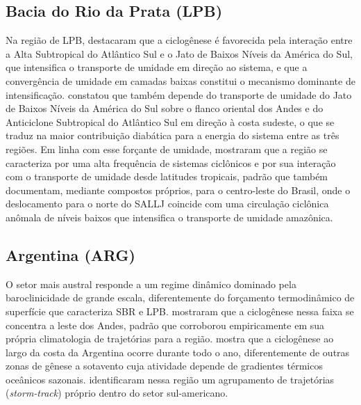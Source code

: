 \subsection{Bacia do Rio da Prata (LPB)}\label{subsec:tb_lpb}
Na região de LPB, \citet{gramcianinov2024early} destacaram que a ciclogênese é favorecida pela interação entre a Alta Subtropical do Atlântico Sul e o Jato de Baixos Níveis da América do Sul, que intensifica o transporte de umidade em direção ao sistema, e que a convergência de umidade em camadas baixas constitui o mecanismo dominante de intensificação.
\citet{coutodesouza2024thesis} constatou que também depende do transporte de umidade do Jato de Baixos Níveis da América do Sul sobre o flanco oriental dos Andes e do Anticiclone Subtropical do Atlântico Sul em direção à costa sudeste, o que se traduz na maior contribuição diabática para a energia do sistema entre as três regiões.
Em linha com esse forçante de umidade, \citet{reboita2010south} mostraram que a região se caracteriza por uma alta frequência de sistemas ciclônicos e por sua interação com o transporte de umidade desde latitudes tropicais, padrão que \citet{laureanti2024relation} também documentam, mediante compostos próprios, para o centro-leste do Brasil, onde o deslocamento para o norte do SALLJ coincide com uma circulação ciclônica anômala de níveis baixos que intensifica o transporte de umidade amazônica.

\subsection{Argentina (ARG)}\label{subsec:tb_arg}
O setor mais austral responde a um regime dinâmico dominado pela baroclinicidade de grande escala, diferentemente do forçamento termodinâmico de superfície que caracteriza SBR e LPB.
\citet{hoskins2005new} mostraram que a ciclogênese nessa faixa se concentra a leste dos Andes, padrão que \citet{coutodesouza2024thesis} corroborou empiricamente em sua própria climatologia de trajetórias para a região.
\citet{sinclair1995climatology} mostra que a ciclogênese ao largo da costa da Argentina ocorre durante todo o ano, diferentemente de outras zonas de gênese a sotavento cuja atividade depende de gradientes térmicos oceânicos sazonais.
\citet{mendes2010climatology} identificaram nessa região um agrupamento de trajetórias (\textit{storm-track}) próprio dentro do setor sul-americano.

